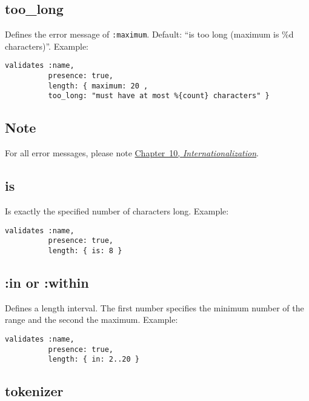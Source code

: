 \documentclass[a4paper]{book}
\begin{document}
\subsection{too\_long}\label{tooux5flong}

Defines the error message of \texttt{:maximum}. Default: “is too long (maximum is \%d characters)”. Example:

\begin{shaded}\begin{verbatim}
validates :name,
          presence: true,
          length: { maximum: 20 ,
          too_long: "must have at most %{count} characters" }
\end{verbatim}\end{shaded}

\subsection{Note}\label{note-28}

For all error messages, please note \hyperref[i18n]{Chapter~10, \emph{Internationalization}}.

\subsection{is}\label{is}

Is exactly the specified number of characters long. Example:

\begin{shaded}\begin{verbatim}
validates :name,
          presence: true,
          length: { is: 8 }
\end{verbatim}\end{shaded}

\subsection{:in or :within}\label{in-or-within}

Defines a length interval. The first number specifies the minimum number of the range and the second the maximum. Example:

\begin{shaded}\begin{verbatim}
validates :name,
          presence: true,
          length: { in: 2..20 }
\end{verbatim}\end{shaded}

\subsection{tokenizer}\label{tokenizer}
\end{document}
